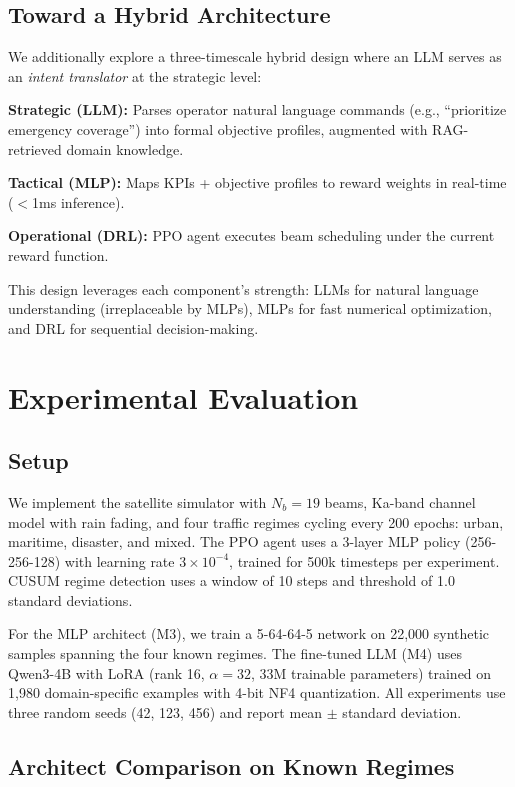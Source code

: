 \documentclass[conference]{IEEEtran}
\begin{document}
\subsection{Toward a Hybrid Architecture}
We additionally explore a three-timescale hybrid design where an LLM serves as an \emph{intent translator} at the strategic level:

\textbf{Strategic (LLM):} Parses operator natural language commands (e.g., ``prioritize emergency coverage'') into formal objective profiles, augmented with RAG-retrieved domain knowledge.

\textbf{Tactical (MLP):} Maps KPIs + objective profiles to reward weights in real-time ($<$1ms inference).

\textbf{Operational (DRL):} PPO agent executes beam scheduling under the current reward function.

This design leverages each component's strength: LLMs for natural language understanding (irreplaceable by MLPs), MLPs for fast numerical optimization, and DRL for sequential decision-making.

\section{Experimental Evaluation}

\subsection{Setup}
We implement the satellite simulator with $N_b = 19$ beams, Ka-band channel model with rain fading, and four traffic regimes cycling every 200 epochs: urban, maritime, disaster, and mixed. The PPO agent uses a 3-layer MLP policy (256-256-128) with learning rate $3 \times 10^{-4}$, trained for 500k timesteps per experiment. CUSUM regime detection uses a window of 10 steps and threshold of 1.0 standard deviations.

For the MLP architect (M3), we train a 5-64-64-5 network on 22,000 synthetic samples spanning the four known regimes. The fine-tuned LLM (M4) uses Qwen3-4B with LoRA (rank 16, $\alpha=32$, 33M trainable parameters) trained on 1,980 domain-specific examples with 4-bit NF4 quantization. All experiments use three random seeds (42, 123, 456) and report mean $\pm$ standard deviation.

\subsection{Architect Comparison on Known Regimes}
\end{document}
